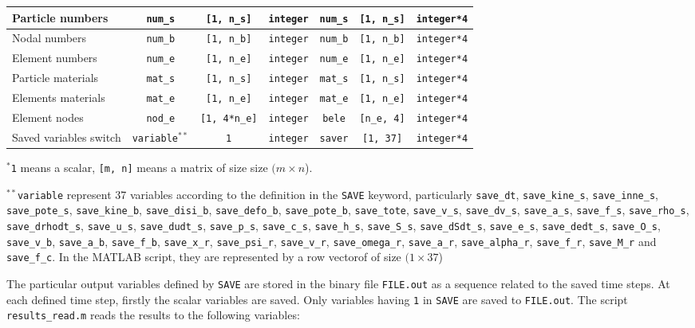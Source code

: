 {\begin{tabular}{|l|c|c|c|c|c|c|}
Particle numbers & \texttt{num\_s} & \texttt{[1, n\_s]} & \texttt{integer} & \texttt{num\_s} & \texttt{[1, n\_s]} & \texttt{integer*4} \\ \hline
Nodal numbers & \texttt{num\_b} & \texttt{[1, n\_b]} & \texttt{integer} & \texttt{num\_b} & \texttt{[1, n\_b]} & \texttt{integer*4} \\ \hline
Element numbers & \texttt{num\_e} & \texttt{[1, n\_e]} & \texttt{integer} & \texttt{num\_e} & \texttt{[1, n\_e]} & \texttt{integer*4} \\ \hline
Particle materials & \texttt{mat\_s} & \texttt{[1, n\_s]} & \texttt{integer} & \texttt{mat\_s} & \texttt{[1, n\_s]} & \texttt{integer*4} \\ \hline
Elements materials & \texttt{mat\_e} & \texttt{[1, n\_e]} & \texttt{integer} & \texttt{mat\_e} & \texttt{[1, n\_e]} & \texttt{integer*4} \\ \hline
Element nodes & \texttt{nod\_e} & \texttt{[1, 4*n\_e]} & \texttt{integer} & \texttt{bele} & \texttt{[n\_e, 4]} & \texttt{integer*4} \\ \hline
Saved variables switch & \texttt{variable}$^{**}$ & \texttt{1} & \texttt{integer} & \texttt{saver} & \texttt{[1, 37]} & \texttt{integer*4} \\ \hline
\end{tabular}
}

$^*$\texttt{1} means a scalar, \texttt{[m, n]} means a matrix of size size $(m\times n$).

$^{**}$\texttt{variable} represent 37 variables according to the definition in the \texttt{SAVE} keyword, particularly \texttt{save\_dt}, \texttt{save\_kine\_s}, \texttt{save\_inne\_s}, \texttt{save\_pote\_s}, \texttt{save\_kine\_b}, \texttt{save\_disi\_b}, \texttt{save\_defo\_b}, \texttt{save\_pote\_b}, \texttt{save\_tote}, \texttt{save\_v\_s}, \texttt{save\_dv\_s}, \texttt{save\_a\_s}, \texttt{save\_f\_s}, \texttt{save\_rho\_s}, \texttt{save\_drhodt\_s}, \texttt{save\_u\_s}, \texttt{save\_dudt\_s}, \texttt{save\_p\_s}, \texttt{save\_c\_s}, \texttt{save\_h\_s}, \texttt{save\_S\_s}, \texttt{save\_dSdt\_s}, \texttt{save\_e\_s}, \texttt{save\_dedt\_s}, \texttt{save\_O\_s}, \texttt{save\_v\_b}, \texttt{save\_a\_b}, \texttt{save\_f\_b}, \texttt{save\_x\_r}, \texttt{save\_psi\_r}, \texttt{save\_v\_r}, \texttt{save\_omega\_r}, \texttt{save\_a\_r}, \texttt{save\_alpha\_r}, \texttt{save\_f\_r}, \texttt{save\_M\_r} and \texttt{save\_f\_c}. In the MATLAB script, they are represented by a row vectorof of size $(1\times 37$)

The particular output variables defined by \texttt{SAVE} are stored in the binary file \texttt{FILE.out} as a sequence related to the saved time steps. At each defined time step, firstly the scalar variables are saved. Only variables having \texttt{1} in \texttt{SAVE} are saved to \texttt{FILE.out}. The script \texttt{results\_read.m} reads the results to the following variables:

